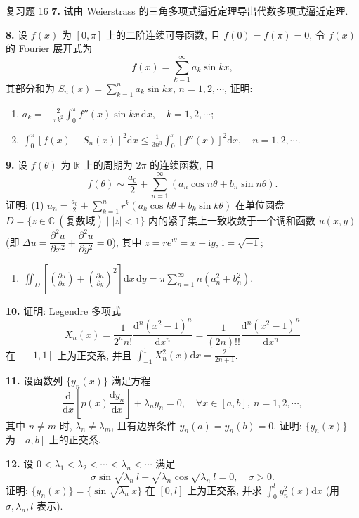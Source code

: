 \begin{exblock}{复习题 16}
\textbf{7.} 试由 Weierstrass 的三角多项式逼近定理导出代数多项式逼近定理.

\textbf{8.} 设 $f(x)$ 为 $[0,\pi]$ 上的二阶连续可导函数, 且 $f(0)=f(\pi)=0$, 令 $f(x)$ 的 Fourier 展开式为
\[
  f(x)=\sum_{k=1}^{\infty}a_{k}\sin kx,
\]
其部分和为 $S_{n}(x)=\displaystyle\sum_{k=1}^{n}a_{k}\sin kx$, $n=1,2,\cdots$, 证明:
\begin{enumerate}
\item $\displaystyle a_{k}=-\frac{2}{\pi k^{2}}\int_{0}^{\pi}f''(x)\sin kx\,\mathrm{d}x,\quad k=1,2,\cdots$;
\item $\displaystyle\int_{0}^{\pi}[f(x)-S_{n}(x)]^{2}\mathrm{d}x\leqslant\frac{1}{3n^{3}}\int_{0}^{\pi}[f''(x)]^{2}\mathrm{d}x,\quad n=1,2,\cdots$.
\end{enumerate}

\textbf{9.} 设 $f(\theta)$ 为 $\mathbb{R}$ 上的周期为 $2\pi$ 的连续函数, 且
\[
  f(\theta)\sim\frac{a_{0}}{2}+\sum_{n=1}^{\infty}\left(a_{n}\cos n\theta+b_{n}\sin n\theta\right).
\]
证明: (1) $\displaystyle u_{n}=\frac{a_{0}}{2}+\sum_{k=1}^{n}r^{k}\left(a_{k}\cos k\theta+b_{k}\sin k\theta\right)$ 在单位圆盘 $D=\{z\in\mathbb{C}\ (\text{复数域})\mid |z|<1\}$ 内的紧子集上一致收敛于一个调和函数 $u(x,y)$ (即 $\Delta u=\dfrac{\partial^{2}u}{\partial x^{2}}+\dfrac{\partial^{2}u}{\partial y^{2}}=0$), 其中 $z=re^{\mathrm{i}\theta}=x+\mathrm{i}y$, $\mathrm{i}=\sqrt{-1}$;
\begin{enumerate}
\item[(2)] $\displaystyle\iint_{D}\left[\left(\frac{\partial u}{\partial x}\right)+\left(\frac{\partial u}{\partial y}\right)^{2}\right]\mathrm{d}x\,\mathrm{d}y=\pi\sum_{n=1}^{\infty}n\left(a_{n}^{2}+b_{n}^{2}\right)$.
\end{enumerate}

\textbf{10.} 证明: Legendre 多项式
\[
  X_{n}(x)=\frac{1}{2^{n}n!}\frac{\mathrm{d}^{n}(x^{2}-1)^{n}}{\mathrm{d}x^{n}}=\frac{1}{(2n)!!}\frac{\mathrm{d}^{n}(x^{2}-1)^{n}}{\mathrm{d}x^{n}}
\]
在 $[-1,1]$ 上为正交系, 并且 $\displaystyle\int_{-1}^{1}X_{n}^{2}(x)\mathrm{d}x=\frac{2}{2n+1}$.

\textbf{11.} 设函数列 $\{y_{n}(x)\}$ 满足方程
\[
  \frac{\mathrm{d}}{\mathrm{d}x}\left[p(x)\frac{\mathrm{d}y_{n}}{\mathrm{d}x}\right]+\lambda_{n}y_{n}=0,\quad\forall x\in[a,b],\ n=1,2,\cdots,
\]
其中 $n\neq m$ 时, $\lambda_{n}\neq\lambda_{m}$, 且有边界条件 $y_{n}(a)=y_{n}(b)=0$. 证明: $\{y_{n}(x)\}$ 为 $[a,b]$ 上的正交系.

\textbf{12.} 设 $0<\lambda_{1}<\lambda_{2}<\cdots<\lambda_{n}<\cdots$ 满足
\[
  \sigma\sin\sqrt{\lambda_{n}}\,l+\sqrt{\lambda_{n}}\cos\sqrt{\lambda_{n}}\,l=0,\quad\sigma>0.
\]
证明: $\{y_{n}(x)\}=\{\sin\sqrt{\lambda_{n}}\,x\}$ 在 $[0,l]$ 上为正交系, 并求 $\displaystyle\int_{0}^{l}y_{n}^{2}(x)\mathrm{d}x$ (用 $\sigma,\lambda_{n},l$ 表示).


\end{exblock}
